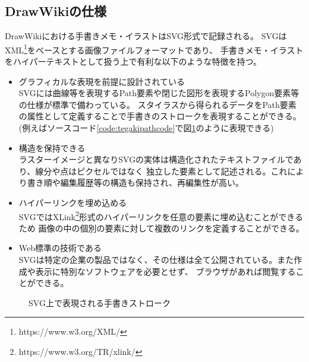 \subsection{DrawWikiの仕様}
DrawWikiにおける手書きメモ・イラストはSVG\cite{aboutsvg}形式で記録される。
SVGはXML\footnote{https://www.w3.org/XML/}をベースとする画像ファイルフォーマットであり、
手書きメモ・イラストをハイパーテキストとして扱う上で有利な以下のような特徴を持つ。
\begin{itemize}
    \item グラフィカルな表現を前提に設計されている\\
    SVGには曲線等を表現するPath要素や閉じた図形を表現するPolygon要素等の仕様が標準で備わっている。
    スタイラスから得られるデータをPath要素の属性として定義することで手書きのストロークを表現することができる。
    (例えばソースコード\ref{code:tegakipathcode}で図\ref{fig:tegakipath}のように表現できる)
    \item 構造を保持できる\\
    ラスターイメージと異なりSVGの実体は構造化されたテキストファイルであり、線分や点はピクセルではなく
    独立した要素として記述される。これにより書き順や編集履歴等の構造も保持され、再編集性が高い。
    \item ハイパーリンクを埋め込める\\
    SVGではXLink\footnote{https://www.w3.org/TR/xlink/}形式のハイパーリンクを任意の要素に埋め込むことができるため
    画像の中の個別の要素に対して複数のリンクを定義することができる。
    \item Web標準の技術である\\
    SVGは特定の企業の製品ではなく、その仕様は全て公開されている。また作成や表示に特別なソフトウェアを必要とせず、
    ブラウザがあれば閲覧することができる。
\end{itemize}

\begin{figure}[htbp]
    \begin{center}
         \end{center}
    \caption{SVG上で表現される手書きストローク} \label{fig:tegakipath}
\end{figure}

